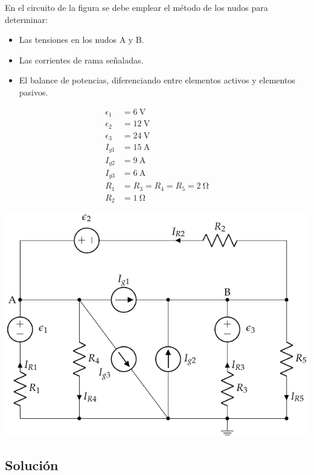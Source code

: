 \documentclass[10pt]{article}
\begin{document}
En el circuito de la figura se debe emplear el método de los nudos para determinar:
\begin{itemize}
\item Las tensiones en los nudos A y B.
\item Las corrientes de rama señaladas.
\item El balance de potencias, diferenciando entre elementos activos y elementos pasivos.
\end{itemize}

\begin{minipage}[c]{0.3\linewidth}
  \begin{align*}
    \epsilon_1&=\SI{6}{\volt}\\
    \epsilon_2&=\SI{12}{\volt}\\
    \epsilon_3&=\SI{24}{\volt}\\
    I_{g1} &= \SI{15}{\ampere}\\
    I_{g2} &= \SI{9}{\ampere}\\
    I_{g3} &= \SI{6}{\ampere}\\
    R_{1}&= R_3 = R_4 = R_5 = \SI{2}{\ohm}\\
    R_{2}&= \SI{1}{\ohm}
  \end{align*}
\end{minipage}
\begin{minipage}[c]{0.7\linewidth}
  \includegraphics{../figs/nudos_fuentes.pdf}
\end{minipage}

\subsection*{Solución}
\end{document}
